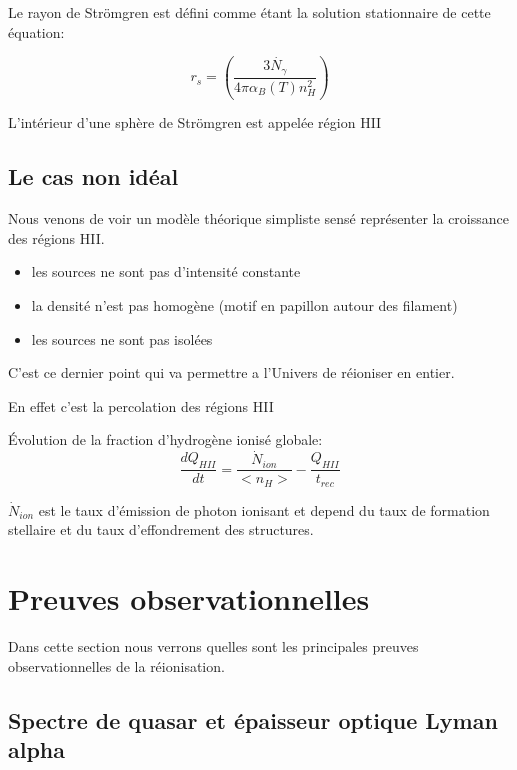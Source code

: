 %

Le rayon de Strömgren est défini comme étant la solution stationnaire de cette équation:

\begin{equation}
r_s = \left( \frac{3 \dot{N_\gamma} }{4 \pi \alpha_B(T) n_H^2} \right)
\end{equation}


L'intérieur d'une sphère de Strömgren est appelée région HII


\subsection{Le cas non idéal}
Nous venons de voir un modèle théorique simpliste sensé représenter la croissance des régions HII.

\begin{itemize}
\item les sources ne sont pas d'intensité constante
\item la densité n'est pas homogène (motif en papillon autour des filament)
\item les sources ne sont pas isolées
\end{itemize}

C'est ce dernier point qui va permettre a l'Univers de réioniser en entier.

En effet c'est la percolation des régions HII 


Évolution de la fraction d'hydrogène ionisé globale:
\begin{equation}
\frac{dQ_{HII}}{dt} = \frac{\dot{N}_{ion}}{ <n_H>} - \frac{Q_{HII}}{t_{rec}}
\end{equation}

$\dot{N}_{ion}$  est le taux d'émission de photon ionisant et depend du taux de formation stellaire et du taux d’effondrement des structures.

\section{Preuves observationnelles}
\label{sec_contraintes_obs}
Dans cette section nous verrons quelles sont les principales preuves observationnelles de la réionisation.

\subsection{Spectre de quasar et épaisseur optique Lyman alpha}

